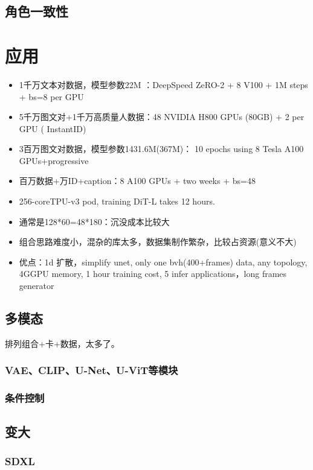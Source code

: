 \documentclass[lang=cn,newtx,10pt,scheme=chinese]{elegantbook}
\begin{document}
\subsection{角色一致性}

\section{应用}
\begin{itemize}
    \item 1千万文本对数据，模型参数22M ：DeepSpeed ZeRO-2 +  8 V100 + 1M steps + bs=8 per GPU
    \item 5千万图文对+1千万高质量人数据：48 NVIDIA H800 GPUs (80GB) + 2 per GPU ( InstantID)
    \item 3百万图文对数据，模型参数1431.6M(367M)： 10 epochs using 8 Tesla A100 GPUs+progressive 
    \item 百万数据+万ID+caption：8 A100 GPUs + two weeks + bs=48
    \item 256-coreTPU-v3 pod, training DiT-L takes 12 hours.
    \item 通常是128*60=48*180：沉没成本比较大
    \item 组合思路难度小，混杂的库太多，数据集制作繁杂，比较占资源(意义不大)
    \item 优点：1d 扩散，simplify unet, only one bvh(400+frames) data, any topology,  4GGPU memory, 1 hour training cost, 5 infer applications，long frames generator
\end{itemize}

\subsection{多模态}

排列组合+卡+数据，太多了。

\subsubsection{VAE、CLIP、U-Net、U-ViT等模块}
\subsubsection{条件控制}

\subsection{变大}
\subsubsection{SDXL}
\end{document}
